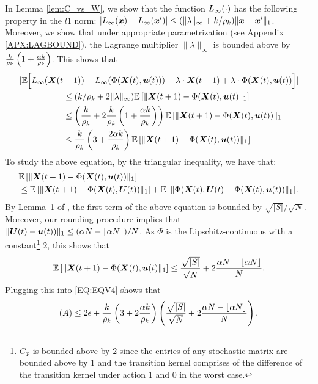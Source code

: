 In Lemma \ref{lem:C_vs_W}, we show that the function $L_{\infty}(\cdot)$ has the following property in the $l1$ norm: $|L_{\infty}({\bm{x}})-L_{\infty}({\bm{x}}')|\le (\|\lambda\|_{\infty} + k/\rho_k)\|{\bm{x}}-{\bm{x}}'\|_1$. Moreover, we show that under appropriate parametrization (see Appendix \ref{APX:LAGBOUND}), the Lagrange multiplier $\|\lambda\|_{\infty}$ is bounded above by $\frac{k}{\rho_k}\left( 1 + \frac{\alpha k}{\rho_{k} }\right)$. This shows that
\begin{align*}
    |\mathbb{E}\Big[L_{\infty}({\bm{X}}(t &+ 1)) - L_{\infty}(\Phi({\bm{X}}(t), \bm{u}(t))) - \lambda\cdot{\bm{X}}(t + 1)  + \lambda \cdot\Phi({\bm{X}}(t), \bm{u}(t))\Big]| \\
    &\le (k/\rho_k + 2\|\lambda\|_\infty)\mathbb{E}\left[\|{\bm{X}}(t + 1) - \Phi({\bm{X}}(t), \bm{u}(t)\|_1\right]\\
    &\le \left(\frac{k}{\rho_k} + 2\frac{k}{\rho_k}\left( 1 + \frac{\alpha k}{\rho_{k}}\right)\right)\mathbb{E}\left[\|{\bm{X}}(t + 1) - \Phi({\bm{X}}(t), \bm{u}(t))\|_1\right]\\
    &\le \frac{k}{\rho_k} \left( 3 + \frac{2\alpha k}{\rho_{k}}\right)\mathbb{E}\left[\|{\bm{X}}(t + 1) - \Phi({\bm{X}}(t), \bm{u}(t))\|_1\right]
\end{align*}
To study the above equation, by the triangular inequality, we have that:
\begin{align*}
    &\mathbb{E}\left[\|{\bm{X}}(t + 1) - \Phi({\bm{X}}(t), \bm{u}(t))\|_1\right]\\
    &\le \mathbb{E}\left[\|{\bm{X}}(t + 1) - \Phi({\bm{X}}(t), \bm{U}(t))\|_1\right] + \mathbb{E}\left[\|\Phi({\bm{X}}(t), \bm{U}(t) - \Phi({\bm{X}}(t), \bm{u}(t))\|_1\right].
\end{align*}
By Lemma~1 of \cite{GGY23b}, the first term of the above equation is bounded by $\sqrt{|S|}/\sqrt{N}$. Moreover, our rounding procedure implies that $\|\bm{U}(t)-\bm{u}(t))\|_1\le (\alpha N - \lfloor\alpha N\rfloor)/N$. 
As $\Phi$ is the Lipschitz-continuous with a constant\footnote{$C_{\Phi}$ is bounded above by $2$ since the entries of any stochastic matrix are bounded above by $1$ and the transition kernel comprises of the difference of the transition kernel under action $1$ and $0$ in the worst case.
} $2$, this shows that
\begin{align*}
    \mathbb{E}\left[\|{\bm{X}}(t + 1) - \Phi({\bm{X}}(t), \bm{u}(t)\|_1\right]\le \frac{\sqrt{|S|}}{\sqrt{N}} + 2\frac{\alpha N - \lfloor\alpha N\rfloor}{N}.
\end{align*}
Plugging this into \eqref{EQ:EQV4} shows that
\begin{align*}
    (A) \le 2\epsilon + \frac{k}{\rho_k} \left( 3 + 2\frac{\alpha k}{\rho_{k}}\right) \left(\frac{\sqrt{|S|}}{\sqrt{N}} + 2\frac{\alpha N - \lfloor\alpha N\rfloor}{N} \right).
\end{align*}
